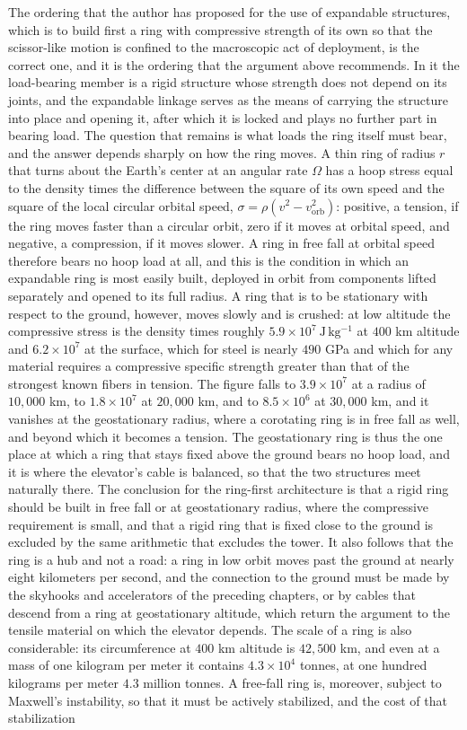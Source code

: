 The ordering that the author has proposed for the use of expandable structures, which is to build first a ring with compressive strength of its own so that the scissor-like motion is confined to the macroscopic act of deployment, is the correct one, and it is the ordering that the argument above recommends. In it the load-bearing member is a rigid structure whose strength does not depend on its joints, and the expandable linkage serves as the means of carrying the structure into place and opening it, after which it is locked and plays no further part in bearing load. The question that remains is what loads the ring itself must bear, and the answer depends sharply on how the ring moves. A thin ring of radius $r$ that turns about the Earth's center at an angular rate $\Omega$ has a hoop stress equal to the density times the difference between the square of its own speed and the square of the local circular orbital speed, $\sigma=\rho(v^2-v_{\mathrm{orb}}^2)$: positive, a tension, if the ring moves faster than a circular orbit, zero if it moves at orbital speed, and negative, a compression, if it moves slower. A ring in free fall at orbital speed therefore bears no hoop load at all, and this is the condition in which an expandable ring is most easily built, deployed in orbit from components lifted separately and opened to its full radius. A ring that is to be stationary with respect to the ground, however, moves slowly and is crushed: at low altitude the compressive stress is the density times roughly $5.9\times10^{7}\ \mathrm{J\,kg^{-1}}$ at $400$ km altitude and $6.2\times10^{7}$ at the surface, which for steel is nearly $490$ GPa and which for any material requires a compressive specific strength greater than that of the strongest known fibers in tension. The figure falls to $3.9\times10^{7}$ at a radius of $10{,}000$ km, to $1.8\times10^{7}$ at $20{,}000$ km, and to $8.5\times10^{6}$ at $30{,}000$ km, and it vanishes at the geostationary radius, where a corotating ring is in free fall as well, and beyond which it becomes a tension. The geostationary ring is thus the one place at which a ring that stays fixed above the ground bears no hoop load, and it is where the elevator's cable is balanced, so that the two structures meet naturally there. The conclusion for the ring-first architecture is that a rigid ring should be built in free fall or at geostationary radius, where the compressive requirement is small, and that a rigid ring that is fixed close to the ground is excluded by the same arithmetic that excludes the tower. It also follows that the ring is a hub and not a road: a ring in low orbit moves past the ground at nearly eight kilometers per second, and the connection to the ground must be made by the skyhooks and accelerators of the preceding chapters, or by cables that descend from a ring at geostationary altitude, which return the argument to the tensile material on which the elevator depends. The scale of a ring is also considerable: its circumference at $400$ km altitude is $42{,}500$ km, and even at a mass of one kilogram per meter it contains $4.3\times10^{4}$ tonnes, at one hundred kilograms per meter $4.3$ million tonnes. A free-fall ring is, moreover, subject to Maxwell's instability, so that it must be actively stabilized, and the cost of that stabilization 